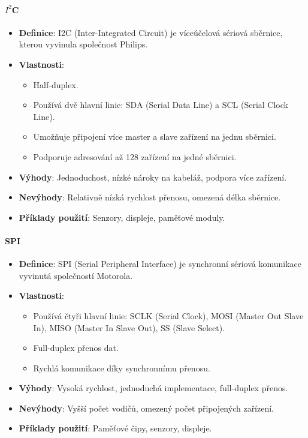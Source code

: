 \paragraph{$I^2$C}
\begin{itemize}
    \item \textbf{Definice}: I2C (Inter-Integrated Circuit) je víceúčelová sériová sběrnice, kterou vyvinula společnost Philips.
    \item \textbf{Vlastnosti}:
    \begin{itemize}
        \item Half-duplex.
        \item Používá dvě hlavní linie: SDA (Serial Data Line) a SCL (Serial Clock Line).
        \item Umožňuje připojení více master a slave zařízení na jednu sběrnici.
        \item Podporuje adresování až 128 zařízení na jedné sběrnici.
    \end{itemize}
    \item \textbf{Výhody}: Jednoduchost, nízké nároky na kabeláž, podpora více zařízení.
    \item \textbf{Nevýhody}: Relativně nízká rychlost přenosu, omezená délka sběrnice.
    \item \textbf{Příklady použití}: Senzory, displeje, paměťové moduly.
\end{itemize}

\paragraph{SPI}
\begin{itemize}
    \item \textbf{Definice}: SPI (Serial Peripheral Interface) je synchronní sériová komunikace vyvinutá společností Motorola.
    \item \textbf{Vlastnosti}:
    \begin{itemize}
        \item Používá čtyři hlavní linie: SCLK (Serial Clock), MOSI (Master Out Slave In), MISO (Master In Slave Out), SS (Slave Select).
        \item Full-duplex přenos dat.
        \item Rychlá komunikace díky synchronnímu přenosu.
    \end{itemize}
    \item \textbf{Výhody}: Vysoká rychlost, jednoduchá implementace, full-duplex přenos.
    \item \textbf{Nevýhody}: Vyšší počet vodičů, omezený počet připojených zařízení.
    \item \textbf{Příklady použití}: Paměťové čipy, senzory, displeje.
\end{itemize}

